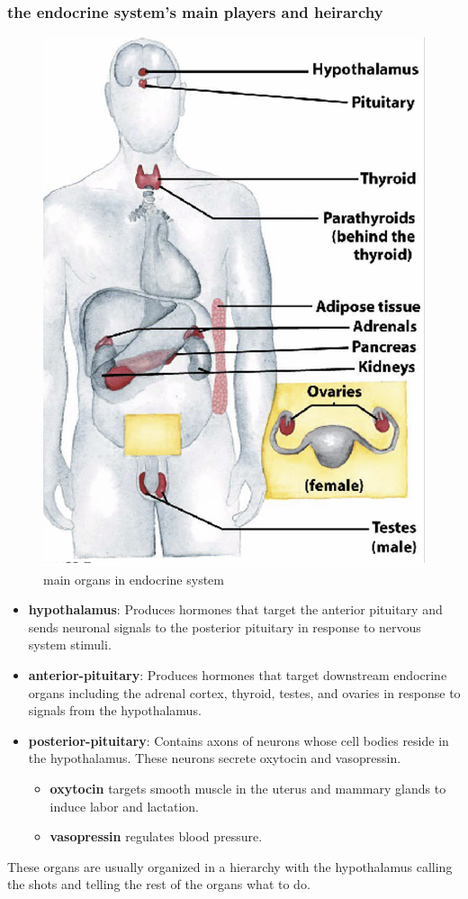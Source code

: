 \documentclass[../main.tex]{subfiles}
\begin{document}
\subsubsection{the endocrine system's main players and heirarchy}
\begin{figure}[H]
    \centering
    \includegraphics[width=0.3\linewidth]{endocrineSystem.png}
    \caption{main organs in endocrine system}
    \label{fig:enter-label}
\end{figure}
\begin{itemize}
    \item \textbf{\gls{hypothalamus}}: Produces hormones that target the anterior pituitary and sends neuronal signals to the posterior pituitary in response to nervous system stimuli.
    
    \item \textbf{\gls{anterior-pituitary}}: Produces hormones that target downstream endocrine organs including the adrenal cortex, thyroid, testes, and ovaries in response to signals from the hypothalamus.
    
    \item \textbf{\gls{posterior-pituitary}}: Contains axons of neurons whose cell bodies reside in the hypothalamus. These neurons secrete \gls{oxytocin} and \gls{vasopressin}.
    
    \begin{itemize}
        \item \textbf{\gls{oxytocin}} targets smooth muscle in the uterus and mammary glands to induce labor and lactation.
        \item \textbf{\gls{vasopressin}} regulates blood pressure.
    \end{itemize}
\end{itemize}
These organs are usually organized in a hierarchy with the hypothalamus calling the shots and telling the rest of the organs what to do.
\end{document}
